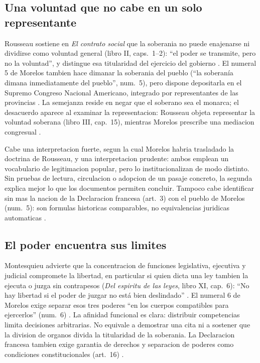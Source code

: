\documentclass[spanish,letterpaper,oneside]{article}
\begin{document}
\subsection{Una voluntad que no cabe en un solo representante}

Rousseau sostiene en \emph{El contrato social} que la soberania no
puede enajenarse ni dividirse como voluntad general (libro II,
caps.~1--2): ``el poder se transmite, pero no la voluntad'', y distingue
esa titularidad del ejercicio del gobierno \citep[p.~23]{rousseau1999}.
El numeral 5 de Morelos tambien hace dimanar la
soberania del pueblo (``la soberanía dimana inmediatamente del pueblo'',
num.~5), pero dispone depositarla en el Supremo Congreso
Nacional Americano, integrado por representantes de las provincias
\citep{morelos2020}. La semejanza reside en negar que el soberano sea
el monarca; el desacuerdo aparece al examinar la representacion:
Rousseau objeta representar la voluntad soberana (libro III, cap.~15),
mientras Morelos prescribe una mediacion congresual
\citep{rousseau1999,morelos2020}.

Cabe una interpretacion fuerte, segun la cual Morelos habria trasladado
la doctrina de Rousseau, y una interpretacion prudente: ambos emplean
un vocabulario de legitimacion popular, pero lo institucionalizan de
modo distinto. Sin pruebas de lectura, circulacion o adopcion de un
pasaje concreto, la segunda explica mejor lo que los documentos
permiten concluir. Tampoco cabe identificar sin mas la nacion de la
Declaracion francesa (art.~3) con el pueblo de Morelos (num.~5): son
formulas historicas comparables, no equivalencias juridicas automaticas
\citep{francia1789,morelos2020}.

\subsection{El poder encuentra sus limites}

Montesquieu advierte que la concentracion de funciones legislativa,
ejecutiva y judicial compromete la libertad, en particular si quien
dicta una ley tambien la ejecuta o juzga sin contrapesos
(\emph{Del espiritu de las leyes}, libro XI, cap.~6): ``No hay libertad
si el poder de juzgar no está bien deslindado''
\citep{montesquieuSinFecha}. El numeral 6 de Morelos exige separar
esos tres poderes ``en los cuerpos compatibles para ejercerlos''
(num.~6) \citep{morelos2020}. La
afinidad funcional es clara: distribuir competencias limita decisiones
arbitrarias. No equivale a demostrar una cita ni a sostener que la
division de organos divida la titularidad de la soberania. La
Declaracion francesa tambien exige garantia de derechos y separacion
de poderes como condiciones constitucionales (art.~16)
\citep{francia1789}.
\end{document}
